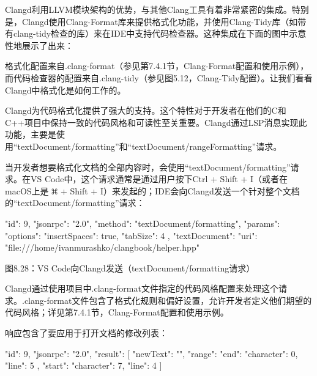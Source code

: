 Clangd利用LLVM模块架构的优势，与其他Clang工具有着非常紧密的集成。特别是，Clangd使用Clang-Format库来提供格式化功能，并使用Clang-Tidy库（如带有clang-tidy检查的库）来在IDE中支持代码检查器。这种集成在下面的图中示意性地展示了出来：


格式化配置来自.clang-format（参见第7.4.1节，Clang-Format配置和使用示例），而代码检查器的配置来自.clang-tidy（参见图5.12，Clang-Tidy配置）。让我们看看Clangd中格式化是如何工作的。



Clangd为代码格式化提供了强大的支持。这个特性对于开发者在他们的C和C++项目中保持一致的代码风格和可读性至关重要。Clangd通过LSP消息实现此功能，主要是使用“textDocument/formatting”和“textDocument/rangeFormatting”请求。


当开发者想要格式化文档的全部内容时，会使用“textDocument/formatting”请求。在VS Code中，这个请求通常是通过用户按下Ctrl + Shift + I（或者在macOS上是 \includegraphics[width=0.02\textwidth]{content/part2/chapter8/images/3.png} + Shift + I）来发起的；IDE会向Clangd发送一个针对整个文档的“textDocument/formatting”请求：

\begin{shell}
{
  "id": 9,
  "jsonrpc": "2.0",
  "method": "textDocument/formatting",
  "params": {
    "options": {
      "insertSpaces": true,
      "tabSize": 4
    },
    "textDocument": {
      "uri": "file:///home/ivanmurashko/clangbook/helper.hpp"
    }
  }
}
\end{shell}


\begin{center}
图8.28：VS Code向Clangd发送（textDocument/formatting请求）
\end{center}

Clangd通过使用项目中.clang-format文件指定的代码风格配置来处理这个请求。.clang-format文件包含了格式化规则和偏好设置，允许开发者定义他们期望的代码风格；详见第7.4.1节，Clang-Format配置和使用示例。

响应包含了要应用于打开文档的修改列表：

\begin{shell}
{
  "id": 9,
  "jsonrpc": "2.0",
  "result": [
  {
    "newText": "\n  ",
    "range": {
      "end": {
        "character": 0,
        "line": 5
      },
      "start": {
        "character": 7,
        "line": 4
      }
    }
  }
  ]
}
\end{shell}



